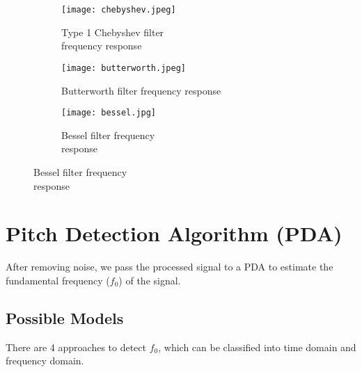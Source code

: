 \begin{figure}[h]
	\centering
	\begin{subfigure}{.32\textwidth}
	  	\centering
	  	\texttt{[image: chebyshev.jpeg]}
	  	\caption{Type 1 Chebyshev filter \\frequency response}
	  	\label{fig:sub1}
	\end{subfigure}

	\begin{subfigure}{.32\textwidth}
	  	\centering
	  	\texttt{[image: butterworth.jpeg]}
	  	\caption{Butterworth filter frequency response}
	  	\label{fig:sub2}
	\end{subfigure}

	\begin{subfigure}{.32\textwidth}
		\centering
		\texttt{[image: bessel.jpg]}
		\caption{Bessel filter frequency\\response}
		\label{fig:sub3}
	\end{subfigure}

\end{figure}

\section{Pitch Detection Algorithm (PDA)}
\label{sec:PDA}
After removing noise, we pass the processed signal to a PDA to estimate the fundamental frequency ($f_0$) of
the signal.

\subsection{Possible Models}
There are 4 approaches to detect $f_0$, which can be classified into time domain and frequency domain.

